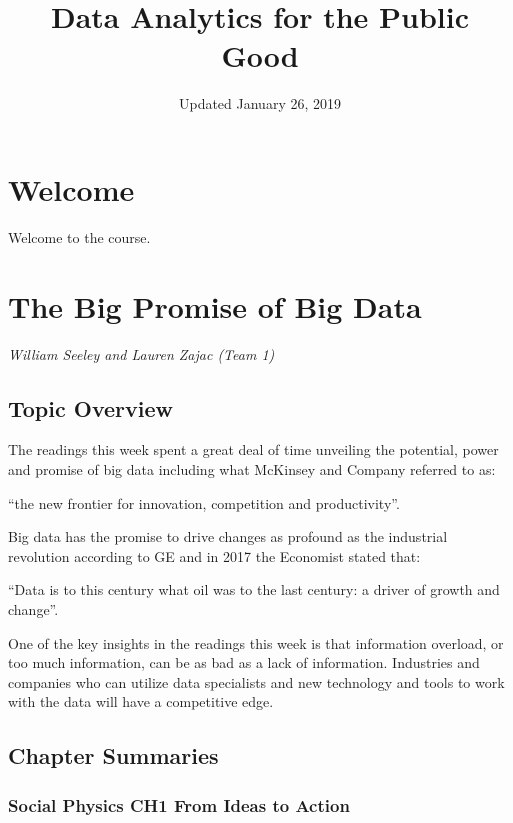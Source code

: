 \documentclass[]{book}
\title{Data Analytics for the Public Good}
\author{}
\date{Updated January 26, 2019}
\begin{document}
\maketitle

{
\setcounter{tocdepth}{1}
\tableofcontents
}
\hypertarget{welcome}{%
\chapter*{Welcome}\label{welcome}}

Welcome to the course.

\hypertarget{the-big-promise-of-big-data}{%
\chapter{The Big Promise of Big Data}\label{the-big-promise-of-big-data}}

\emph{William Seeley and Lauren Zajac (Team 1)}

\hypertarget{topic-overview}{%
\section{Topic Overview}\label{topic-overview}}

The readings this week spent a great deal of time unveiling the potential, power and promise of big data including
what McKinsey and Company referred to as:

``the new frontier for innovation, competition and productivity''.

Big data has the promise to drive changes as profound as the industrial revolution according to GE and in 2017 the Economist
stated that:

``Data is to this century what oil was to the last century: a driver of growth and change''.

One of the key insights in the readings this week is that information overload, or too much information, can be as bad as a lack of information. Industries and companies who can utilize data specialists and new technology and tools to work with the data will have a
competitive edge.

\hypertarget{chapter-summaries}{%
\section{Chapter Summaries}\label{chapter-summaries}}

\hypertarget{social-physics-ch1-from-ideas-to-action}{%
\subsection{\texorpdfstring{Social Physics \textbf{CH1 From Ideas to Action}}{Social Physics CH1 From Ideas to Action}}\label{social-physics-ch1-from-ideas-to-action}}
\end{document}

